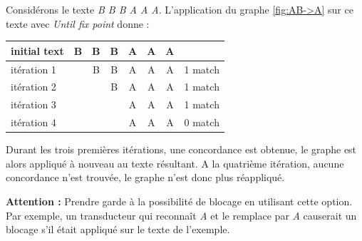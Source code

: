 Considérons le texte \emph{B B B A A A}. L'application du graphe \ref{fig:AB->A} sur ce texte avec \emph{Until fix point}  donne :\\

\begin{tabular}{|l|cccccc|r|}
\hline
initial text  &B&B&B&A&A&A&\\
\hline
itération 1 & &B&B&A&A&A& 1 match\\
itération 2 & & &B&A&A&A& 1 match\\
itération 3 & & & &A&A&A& 1 match\\
itération 4 & & & &A&A&A& 0 match\\
\hline
\end{tabular}

\bigskip
Durant les trois premières itérations, une concordance est obtenue, le graphe
est alors appliqué à nouveau au texte résultant. A la quatrième itération, aucune
concordance n'est trouvée, le graphe n'est donc plus réappliqué.

\bigskip
\large{\textbf{Attention :}} Prendre garde à la possibilité de blocage en utilisant cette 
option. Par exemple, un transducteur qui reconnaît \emph{A} et le remplace par
\emph{A} causerait un blocage s'il était appliqué sur le texte de l'exemple.

